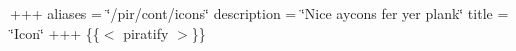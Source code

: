 +++ aliases = \char`\"{}/pir/cont/icons\char`\"{} description = \char`\"{}\+Nice ay\textquotesingle{}cons fer yer plank\char`\"{} title = \char`\"{}\+Icon\char`\"{} +++ \{\{$<$ piratify $>$\}\} 